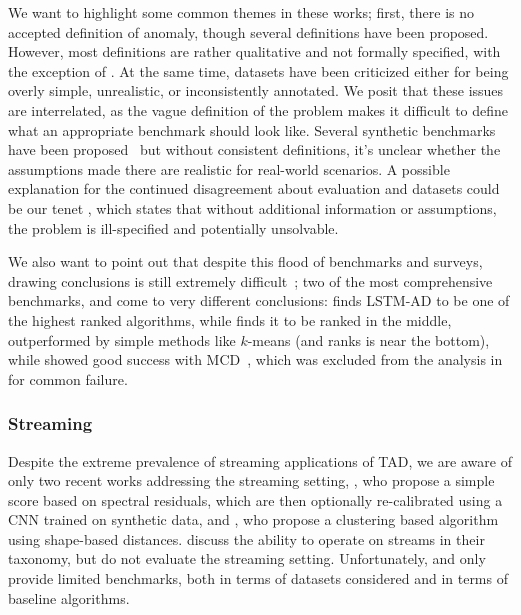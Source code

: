 We want to highlight some common themes in these works; first, there is no accepted definition of anomaly, though several definitions have been proposed. However, most definitions are rather qualitative and not formally specified, with the exception of \citet{lai2021revisiting}. At the same time, datasets have been criticized either for being overly simple, unrealistic, or inconsistently annotated. We posit that these issues are interrelated, as the vague definition of the problem makes it difficult to define what an appropriate benchmark should look like. Several synthetic benchmarks have been proposed~\citep{schmidl2022anomaly, lai2021revisiting} but without consistent definitions, it's unclear whether the assumptions made there are realistic for real-world scenarios.
A possible explanation for the continued disagreement about evaluation and datasets could be our tenet \applicationspecific, which states that without additional information or assumptions, the problem is ill-specified and potentially unsolvable.

We also want to point out that despite this flood of benchmarks and surveys, drawing conclusions is still extremely difficult~\citep{sorbo2024navigating}; two of the most comprehensive benchmarks, \citet{schmidl2022anomaly} and \citet{liu2024elephant} come to very different conclusions: \citet{schmidl2022anomaly} finds LSTM-AD to be one of the highest ranked algorithms, while \citet{liu2024elephant} finds it to be ranked in the middle, outperformed by simple methods like $k$-means (and \citet{paparrizos2022tsb} ranks is near the bottom), while \citet{liu2024elephant} showed good success with MCD~\citep{rousseeuw1999fast}, which was excluded from the analysis in \citet{schmidl2022anomaly} for common failure.


\subsubsection{Streaming}\label{sec:related_streaming}
Despite the extreme prevalence of streaming applications of TAD, we are aware of only two recent works addressing the streaming setting, \citet{ren2019time}, who propose a simple score based on spectral residuals, which are then optionally re-calibrated using a CNN trained on synthetic data, and \citet{boniol2021sand}, who propose a clustering based algorithm using shape-based distances. \citet{schmidl2022anomaly} discuss the ability to operate on streams in their taxonomy, but do not evaluate the streaming setting. Unfortunately, \citet{ren2019time} and \citet{boniol2021sand} only provide limited benchmarks, both in terms of datasets considered and in terms of baseline algorithms.

